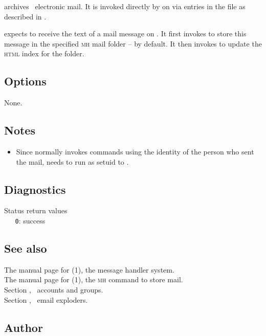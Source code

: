  archives \aipspp\ electronic mail.  It is invoked directly by
 on  via entries in the
 file as described in .

 expects to receive the text of a mail message on .
It first invokes  to store this message in the specified
\textsc{mh} mail folder --  by default.  It then invokes
 to update the \textsc{html} index for the folder.

\subsection*{Options}

None.

\subsection*{Notes}

\begin{itemize}
\item
   Since  normally invokes commands using the identity of
   the person who sent the mail,  needs to run as setuid to
   .
\end{itemize}

\subsection*{Diagnostics}

Status return values
\\ \verb+   0+: success

\subsection*{See also}

The manual page for (1), the message handler system.\\
The manual page for (1), the \textsc{mh} command to store
   mail.\\
Section , \aipspp\ accounts and groups.\\
Section , \aipspp\ email exploders.

\subsection*{Author}


